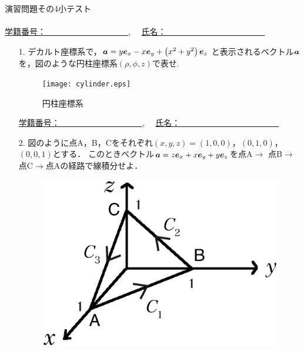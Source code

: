 \documentclass[11pt]{jarticle}
\def \vec#1{\mbox{\boldmath $#1$}} %
\begin{document}
\begin{center}
{\Large
演習問題その4小テスト}\\
\ \\
\underline{学籍番号：　　　　　　　　　　},　
\underline{氏名：　　　　　　　　　　　　}
\end{center}
\begin{enumerate}
\item[1.]
デカルト座標系で，$\vec{a}=y \vec{e}_x - x \vec{e}_y + \left(x^2+y^2 \right) \vec{e}_z$
と表示されるベクトル$\vec{a}$を，図のような円柱座標系$(\rho,\phi,z)$で表せ.
\begin{figure}[h]
 \begin{center}
\texttt{[image: cylinder.eps]}\caption{円柱座標系}
\end{center}
\label{fig:1}
\end{figure}

\newpage
\begin{center}
\underline{学籍番号：　　　　　　　　　　},　
\underline{氏名：　　　　　　　　　　　　}
\end{center}

\item[2.]
図のように点A，B，Cをそれぞれ$\left(x, y, z \right)=\left(1, 0, 0 \right)$，$\left(0, 1, 0 \right)$，$\left(0, 0, 1 \right)$とする．
このときベクトル$\vec a=z \bm{e}_{x}+x \bm{e}_{y}+y \bm{e}_{z}$を点A$\rightarrow$
点B$\rightarrow$点C$\rightarrow$点Aの経路で線積分せよ．
\begin{figure}[h]
\begin{center}
\includegraphics[width=.4\textwidth
]{3men.eps}
\label{b}
\end{center}
\end{figure}
\end{enumerate}
\end{document}
